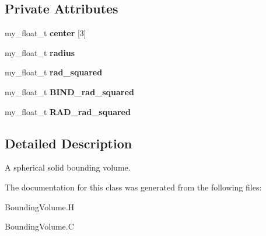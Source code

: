 \subsection*{Private Attributes}
\begin{CompactItemize}
\item 
my\_\-float\_\-t \textbf{center} [3]\label{classASCbase_1_1Ball_8cdfc3ec26ff94910d7a217fdf00b122}

\item 
my\_\-float\_\-t \textbf{radius}\label{classASCbase_1_1Ball_b10e3e683d98de2a313d95db8b1c2b5c}

\item 
my\_\-float\_\-t \textbf{rad\_\-squared}\label{classASCbase_1_1Ball_005b5e685fffb4e47e10ffba05f2c608}

\item 
my\_\-float\_\-t \textbf{BIND\_\-rad\_\-squared}\label{classASCbase_1_1Ball_46f12f5f5ce2f6ec63af22bb30cbcc39}

\item 
my\_\-float\_\-t \textbf{RAD\_\-rad\_\-squared}\label{classASCbase_1_1Ball_6124ef4765e6a8fb6653fae9fb06c927}

\end{CompactItemize}


\subsection{Detailed Description}
A spherical solid bounding volume. 



The documentation for this class was generated from the following files:\begin{CompactItemize}
\item 
Bounding\-Volume.H\item 
Bounding\-Volume.C\end{CompactItemize}
